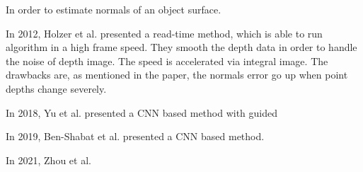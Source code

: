 

In order to estimate normals of an object surface.

In 2012, Holzer et al. \cite{Holzer.S} presented a read-time method, which is able to run algorithm in a high frame speed. They smooth the depth data in order to handle the noise of depth image. The speed is accelerated via integral image. The drawbacks are, as mentioned in the paper, the normals error go up when point depths change severely.

In 2018, Yu et al. \cite{gconv} presented a CNN based method with guided 

In 2019, Ben-Shabat et al. \cite{Ben-Shabat_2019_CVPR} presented a CNN based method.


In 2021, Zhou et al.  \cite{zhou2021fast}



